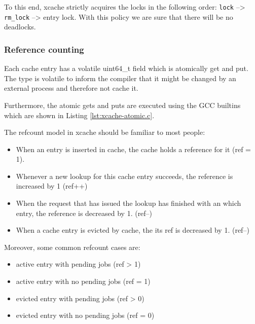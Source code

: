 To this end, xcache strictly acquires the locks in the following order: 
\texttt{lock} --> \texttt{rm\_lock} --> entry lock. With this policy we are 
sure that there will be no deadlocks.

\subsubsection{Reference counting}\label{sec:xcache-refcount-imp}

Each cache entry has a volatile uint64\_t field which is atomically get and 
put. The type is volatile to inform the compiler that it might be changed by an 
external process and therefore not cache it.

Furthermore, the atomic gets and puts are executed using the GCC 
builtins\cite{gcc-atomic} which are shown in Listing \ref{lst:xcache-atomic.c}.


The refcount model in xcache should be familiar to most people:

\begin{itemize}
	\item When an entry is inserted in cache, the cache holds a reference 
		for it (ref = 1).
	\item Whenever a new lookup for this cache entry succeeds, the reference 
		is increased by 1 (ref++)
	\item When the request that has issued the lookup has finished with an 
		which entry, the reference is decreased by 1. (ref--)
	\item When a cache entry is evicted by cache, the its ref is decreased 
		by 1. (ref--)
\end{itemize}

Moreover, some common refcount cases are:

\begin{itemize}
	\item active entry with pending jobs (ref > 1)
	\item active entry with no pending jobs (ref = 1)
	\item evicted entry with pending jobs (ref > 0)
	\item evicted entry with no pending jobs (ref = 0)
\end{itemize}

\begin{comment}
\begin{table}
	\centering
	\begin{tabular}{ | l | l | }
		\hline
		Case & Refcount \\ \hline \hline
		active entry with pending jobs & ref > 1 \\ \hline
		active entry with no pending jobs & ref = 1 \\ \hline
		evicted entry with pending jobs & ref > 0 \\ \hline
		evicted entry with no pending jobs & ref = 0 \\ \hline
	\end{tabular}
	\caption{Reference counting of xcache}
	\label{tab:refcount}
\end{table}
\end{comment}

